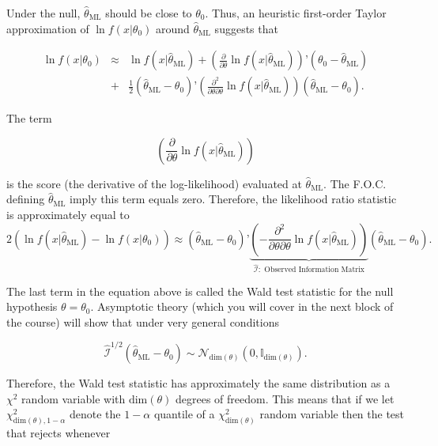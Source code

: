 \documentclass[11pt]{article} %
\begin{document}
\noindent Under the null, $\widehat{\theta}_{\textrm{ML}}$ should be close to $\theta_0$. Thus, an heuristic first-order Taylor approximation of $\ln f(x|\theta_0)$ around $\widehat{\theta}_{\textrm{ML}}$ suggests that

\begin{eqnarray*}
 \ln f(x| \theta_0) &\approx& \ln f( x | \widehat{\theta}_{\textrm{ML}}) + \left( \frac{\partial}{\partial \theta} \ln f( x | \widehat{\theta}_{\textrm{ML}})\right )’ (\theta_0-\widehat{\theta}_{\textrm{ML}}) \\
&+& \frac{1}{2} (\widehat{\theta}_{\textrm{ML}}-\theta_0)’  \left( \frac{\partial^2}{\partial \theta \partial \theta} \ln f( x | \widehat{\theta}_{\textrm{ML}})\right ) (\widehat{\theta}_{\textrm{ML}}-\theta_0). 
\end{eqnarray*}

\noindent The term

\[ \left( \frac{\partial}{\partial \theta} \ln f( x | \widehat{\theta}_{\textrm{ML}})\right ) \] 

\noindent is the score (the derivative of the log-likelihood) evaluated at $\widehat{\theta}_{\textrm{ML}}$. The F.O.C. defining $\widehat{\theta}_{\textrm{ML}}$ imply this term equals zero. Therefore, the likelihood ratio statistic is approximately equal to
\[2(\ln f( x | \widehat{\theta}_{\textrm{ML}}) - \ln f(x| \theta_0)) \approx (\widehat{\theta}_{\textrm{ML}}-\theta_0)’  \underbrace{\left( -\frac{\partial^2}{\partial \theta \partial \theta} \ln f( x | \widehat{\theta}_{\textrm{ML}})\right )}_{\widehat{\mathcal{I}}: \textrm{ Observed Information Matrix}}  (\widehat{\theta}_{\textrm{ML}}-\theta_0).    \]

\noindent The last term in the equation above is called the Wald test statistic for the null hypothesis $\theta = \theta_0$. Asymptotic theory (which you will cover in the next block of the course) will show that under very general conditions 

\[ \widehat{\mathcal{I}}^{1/2}(\widehat{\theta}_{\textrm{ML}}-\theta_0) \sim \mathcal{N}_{\textrm{dim}(\theta)} (0, \mathbb{I}_{\textrm{dim}(\theta)}).\]

\noindent Therefore, the Wald test statistic has approximately the same distribution as a $\chi^2$ random variable with $\textrm{dim}(\theta)$ degrees of freedom. This means that if we let $\chi^2_{\textrm{dim}(\theta),1-\alpha}$ denote the $1-\alpha$ quantile of a $\chi^2_{\textrm{dim}(\theta)}$ random variable then the test that rejects whenever
\end{document}
